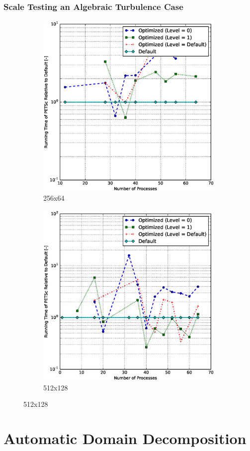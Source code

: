 \documentclass[11pt]{beamer}
\begin{document}
\begin{frame}
  \frametitle{Scale Testing an Algebraic Turbulence Case}
  \begin{figure}[h]
    \centering
    \begin{subfigure}{0.45\textwidth}
      \includegraphics[width=\textwidth]{petsc/algebraic-256x64}
      \caption{256x64}
    \end{subfigure}
    \hfill
    \begin{subfigure}{0.45\textwidth}
      \includegraphics[width=\textwidth]{petsc/algebraic-512x128}
      \caption{512x128}
    \end{subfigure}
  \end{figure}
\end{frame}

\section{Automatic Domain Decomposition}
\end{document}
